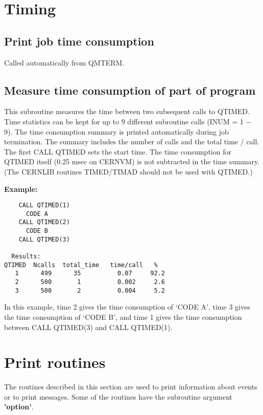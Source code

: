 \section{\label{sec-OARTI}Timing}
\par
\subsection{\label{sec-OARPT}Print job time consumption}
\par
{}
\par
\par
Called automatically from QMTERM.
 
\subsection{\label{sec-OARTE}Measure time consumption of part of
program}
\par
{}
\par
\par
This subroutine measures the time between two subsequent calls
to QTIMED. 
Time statistics can be kept for up to 9 different
subroutine calls (INUM = 1 $-$ 9).
The time consumption
summary is printed automatically during job termination.
The summary includes the number of calls and the total time / call.
The first CALL QTIMED sets the start time. The time consumption for
QTIMED itself (0.25 msec on CERNVM) is not subtracted in the time
summary.
(The CERNLIB routines TIMED/TIMAD should not be used with QTIMED.)
 
{\bf Example:}
\begin{verbatim}
    CALL QTIMED(1)
      CODE A
    CALL QTIMED(2)
      CODE B
    CALL QTIMED(3)
 
  Results:
QTIMED  Ncalls  total_time   time/call   %
   1      499      35          0.07     92.2
   2      500       1          0.002     2.6
   3      500       2          0.004     5.2
\end{verbatim}
In this example, time 2 gives the time consumption of `CODE A', time 3
gives the time consumption of `CODE B', and time 1 gives the time consumption
between CALL QTIMED(3) and CALL QTIMED(1).
\section{\label{sec-OARPR}Print routines}
\par
The routines described in this section are used to print information
about events or to print messages.
Some of the routines have the subroutine argument {\bf 'option'}.
 

